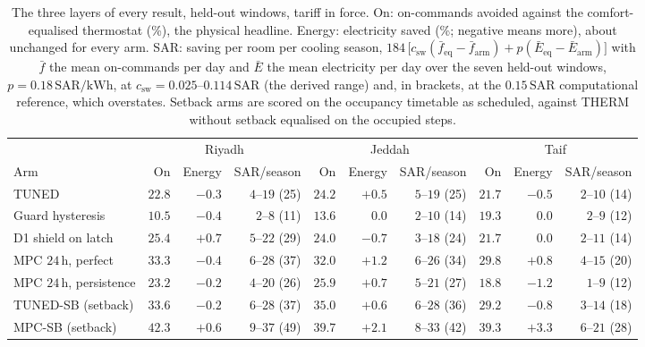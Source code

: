 \documentclass[3p,twocolumn,number]{elsarticle}
\newcommand{\csw}{c_{\mathrm{sw}}}
\newcommand{\SAR}{\text{SAR}}
\newcommand{\kWh}{\text{kWh}}
\begin{document}
\begin{table}[t]
\centering
\caption{The three layers of every result, held-out windows, tariff in force.
On: on-commands avoided against the comfort-equalised thermostat (\%), the
physical headline. Energy: electricity saved (\%; negative means more), about
unchanged for every arm. SAR: saving per room per cooling season,
$184\,\bigl[\csw(\bar f_{\mathrm{eq}}-\bar f_{\mathrm{arm}})+p(\bar E_{\mathrm{eq}}-\bar E_{\mathrm{arm}})\bigr]$
with $\bar f$ the mean on-commands per day and $\bar E$ the mean electricity per
day over the seven held-out windows, $p=0.18\,\SAR/\kWh$, at
$\csw=0.025$--$0.114\,\SAR$ (the derived range) and, in brackets, at the
$0.15\,\SAR$ computational reference, which overstates. Setback arms are
scored on the occupancy timetable as scheduled, against THERM without setback
equalised on the occupied steps.}
\label{tab:layers}
\setlength{\tabcolsep}{2pt}
\footnotesize
\begin{tabular*}{\textwidth}{@{\extracolsep{\fill}}lrrrrrrrrr@{}}
\toprule
 & \multicolumn{3}{c}{Riyadh} & \multicolumn{3}{c}{Jeddah} & \multicolumn{3}{c}{Taif} \\
\cmidrule(lr){2-4}\cmidrule(lr){5-7}\cmidrule(lr){8-10}
Arm & On & Energy & SAR/season & On & Energy & SAR/season & On & Energy & SAR/season \\
\midrule
TUNED & $22.8$ & $-0.3$ & $4$--$19$ (25) & $24.2$ & $+0.5$ & $5$--$19$ (25) & $21.7$ & $-0.5$ & $2$--$10$ (14) \\
Guard hysteresis & $10.5$ & $-0.4$ & $2$--$8$ (11) & $13.6$ & $0.0$ & $2$--$10$ (14) & $19.3$ & $0.0$ & $2$--$9$ (12) \\
D1 shield on latch & $25.4$ & $+0.7$ & $5$--$22$ (29) & $24.0$ & $-0.7$ & $3$--$18$ (24) & $21.7$ & $0.0$ & $2$--$11$ (14) \\
MPC $24\,$h, perfect & $33.3$ & $-0.4$ & $6$--$28$ (37) & $32.0$ & $+1.2$ & $6$--$26$ (34) & $29.8$ & $+0.8$ & $4$--$15$ (20) \\
MPC $24\,$h, persistence & $23.2$ & $-0.2$ & $4$--$20$ (26) & $25.9$ & $+0.7$ & $5$--$21$ (27) & $18.8$ & $-1.2$ & $1$--$9$ (12) \\
TUNED-SB (setback) & $33.6$ & $-0.2$ & $6$--$28$ (37) & $35.0$ & $+0.6$ & $6$--$28$ (36) & $29.2$ & $-0.8$ & $3$--$14$ (18) \\
MPC-SB (setback) & $42.3$ & $+0.6$ & $9$--$37$ (49) & $39.7$ & $+2.1$ & $8$--$33$ (42) & $39.3$ & $+3.3$ & $6$--$21$ (28) \\
\bottomrule
\end{tabular*}
\end{table}
\end{document}
